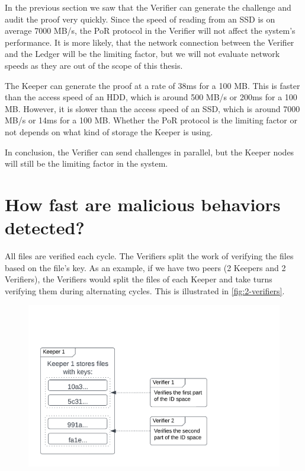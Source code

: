 In the previous section we saw that the Verifier can generate the challenge and audit the proof very quickly.
Since the speed of reading from an SSD is on average 7000 MB/s, the PoR protocol in the Verifier
will not affect the system's performance.
It is more likely, that the network connection between the Verifier and the Ledger will be the limiting factor,
but we will not evaluate network speeds as they are out of the scope of this thesis.

The Keeper can generate the proof at a rate of 38ms for a 100 MB.
This is faster than the access speed of an HDD, which is around 500 MB/s or 200ms for a 100 MB.
However, it is slower than the access speed of an SSD, which is around 7000 MB/s or 14ms for a 100 MB.
Whether the PoR protocol is the limiting factor or not depends on what kind of storage the Keeper is using.

In conclusion, the Verifier can send challenges in parallel, but the Keeper nodes will still be
the limiting factor in the system.


\section{How fast are malicious behaviors detected?}

All files are verified each cycle.
The Verifiers split the work of verifying the files based on the file's key.
As an example, if we have two peers (2 Keepers and 2 Verifiers),
the Verifiers would split the files of each Keeper and take turns verifying them
during alternating cycles.
This is illustrated in \autoref{fig:2-verifiers}.

\begin{figure}
    \centering
    \includegraphics[width=350pt]{gfx/2-verifiers.png}
    \label{fig:2-verifiers}
\end{figure}

